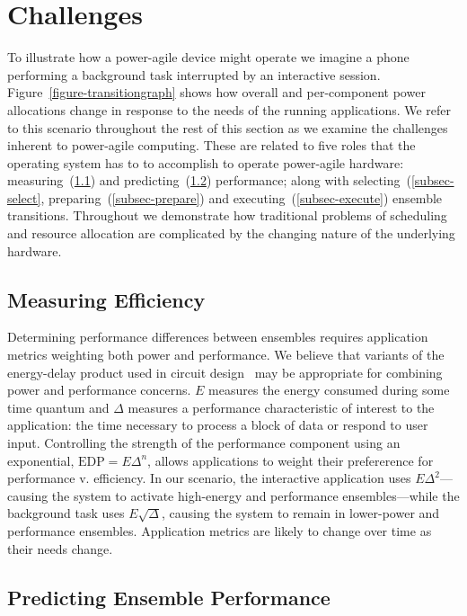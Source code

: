 \section{Challenges}
\label{sec-challenges}



To illustrate how a power-agile device might operate we imagine a phone
performing a background task interrupted by an interactive session.
Figure~\ref{figure-transitiongraph} shows how overall and per-component power
allocations change in response to the needs of the running applications. We
refer to this scenario throughout the rest of this section as we examine the
challenges inherent to power-agile computing. These are related to five roles
that the operating system has to to accomplish to operate power-agile
hardware: measuring~(\ref{subsec-measure}) and
predicting~(\ref{subsec-predict}) performance; along with
selecting~(\ref{subsec-select}, preparing~(\ref{subsec-prepare}) and
executing~(\ref{subsec-execute}) ensemble transitions. Throughout we
demonstrate how traditional problems of scheduling and resource allocation
are complicated by the changing nature of the underlying hardware.

\subsection{Measuring Efficiency}
\label{subsec-measure}

Determining performance differences between ensembles requires application
metrics weighting both power and performance. We believe that variants of the
energy-delay product used in circuit design~\cite{martin-et2} may be
appropriate for combining power and performance concerns. $E$ measures the
energy consumed during some time quantum and $\Delta$ measures a performance
characteristic of interest to the application: the time necessary to process
a block of data or respond to user input. Controlling the strength of the
performance component using an exponential, $\textrm{EDP} = E\Delta^n$,
allows applications to weight their prefererence for performance v.
efficiency. In our scenario, the interactive application uses
$E\Delta^2$---causing the system to activate high-energy and performance
ensembles---while the background task uses $E\sqrt{\Delta}$, causing the
system to remain in lower-power and performance ensembles. Application
metrics are likely to change over time as their needs change.

\subsection{Predicting Ensemble Performance}
\label{subsec-predict}


